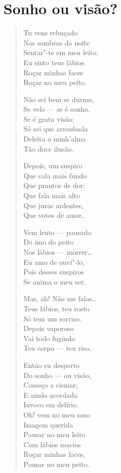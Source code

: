 \chapter{Sonho ou visão?}

\begin{verse}
Tu vens rebuçado\\
Nas sombras da noite\\
Sentar"-te em meu leito;\\
Eu sinto teus lábios\\
Roçar minhas faces\\
Roçar no meu peito.

Não sei bem se durmo,\\
Se velo --- se é sonho.\\
Se é grata visão;\\
Só sei que arroubada\\
Deleita a minh'alma\\
Tão doce ilusão.

Depois, um suspiro\\
Que cala mais fundo\\
Que prantos de dor;\\
Que fala mais alto\\
Que juras ardentes,\\
Que votos de amor,

Vem lento --- pausado\\
Do imo do peito\\
Nos lábios --- morrer\ldots{}\\
Eu amo de ouvi"-lo,\\
Pois desses suspiros\\
Se anima o meu ser.

Mas, ah! Não me falas\ldots{}\\
Teus lábios, teu rosto\\
Só tem um sorriso.\\
Depois vaporoso\\
Vai todo fugindo\\
Teu corpo --- teu riso.

Então eu desperto\\
Do sonho --- ou visão,\\
Começo a cismar;\\
E ainda acordada\\
Invoco em delírio.\\
Oh! vem no meu sono\\
Imagem querida\\
Pousar no meu leito\\
Com lábios macios\\
Roçar minhas faces,\\
Pousar no meu peito.
\end{verse}

